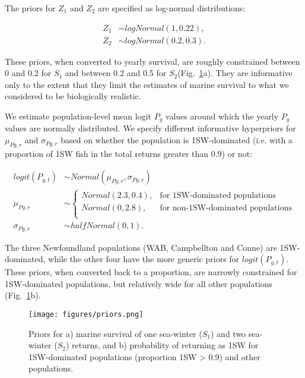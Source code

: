 \documentclass[12pt]{article}
\newcommand{\So}{$S_{1}$\xspace}
\newcommand{\St}{$S_{2}$\xspace}
\newcommand{\Pg}{$P_g$\xspace}
\newcommand{\prmu}{$\mu_{Pg,r}$\xspace}
\newcommand{\prsig}{$\sigma_{Pg,r}$\xspace}
\begin{document}
The priors for $Z_1$ and $Z_2$ are specified as log-normal distributions:

\begin{align}
Z_1 &\sim logNormal(1, 0.22),   \\ 
Z_2 &\sim logNormal(0.2, 0.3).
\end{align}

These priors, when converted to yearly survival, are roughly constrained between
0 and 0.2 for \So and between 0.2 and 0.5 for \St (Fig.~\ref{fig:priors}a). They are
informative only to the extent that they limit the estimates of marine survival
to what we considered to be biologically realistic.

We estimate population-level mean logit \Pg values around which the yearly \Pg
values are normally distributed. We specify different informative hyperpriors
for \prmu and \prsig based on whether the population is 1SW-dominated (i.e.
with a proportion of 1SW fish in the total returns greater than 0.9) or not:

\begin{align}
    logit(P_{g,t}) &\sim Normal(\mu_{Pg,r}, \sigma_{Pg,r}) \\
    \mu_{Pg,r} &\sim 
    \begin{cases}
       Normal(2.3, 0.4),  &\text{for 1SW-dominated populations} \\
       Normal(0, 2.8), &\text{for non-1SW-dominated populations} \\
   \end{cases} \\
    \sigma_{Pg,r} &\sim halfNormal(0, 1).
\end{align}

The three Newfoundland populations (WAB, Campbellton and Conne) are 
1SW-dominated, while the other four have the more generic priors for $logit(P_{g,t})$.
These priors, when converted back to a proportion, are narrowly constrained
for 1SW-dominated populations, but relatively wide for all other populations
(Fig.~\ref{fig:priors}b).

\begin{figure}[htbp] \centering
    \texttt{[image: figures/priors.png]} \caption{Priors
        for a) marine survival of one sea-winter (\So) and two sea-winter
        (\St) returns, and b) probability of returning as 1SW for
        1SW-dominated populations (proportion 1SW > 0.9) and other populations.}
    \label{fig:priors} 
\end{figure}
\end{document}
